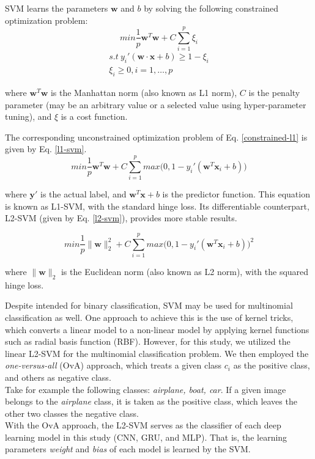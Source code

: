 \documentclass[sigconf]{acmart}
\renewcommand{\vec}[1]{\mathbf{#1}}
\begin{document}
SVM learns the parameters $\vec{w}$ and $b$ by solving the following constrained optimization problem:
\begin{equation} \label{constrained-l1}
min \dfrac{1}{p}\vec{w}^{T}\vec{w} + C \sum_{i = 1}^{p} \xi_i
\end{equation}
\begin{align}
s.t\ y_{i}'(\vec{w} \cdot \vec{x} + b) \geq 1 - \xi_i\\
\xi_i \geq 0, i = 1, \dots, p
\end{align}

where $\vec{w}^{T} \vec{w}$ is the Manhattan norm (also known as L1 norm), $C$ is the penalty parameter (may be an arbitrary value or a selected value using hyper-parameter tuning), and $\xi$ is a cost function.

The corresponding unconstrained optimization problem of Eq. \ref{constrained-l1} is given by Eq. \ref{l1-svm}.
\begin{equation} \label{l1-svm}
min \dfrac{1}{p}\vec{w}^{T}\vec{w} + C \sum_{i = 1}^{p} max\big(0, 1 - y_{i}'(\vec{w}^{T}\vec{x}_{i}+b)\big)
\end{equation}

\indent where $\vec{y'}$ is the actual label, and $\vec{w}^T\vec{x} + b$ is the predictor function. This equation is known as L1-SVM, with the standard hinge loss. Its differentiable counterpart, L2-SVM (given by Eq. \ref{l2-svm}), provides more stable results\cite{tang2013deep}.

\begin{equation}\label{l2-svm}
min \dfrac{1}{p}\|\vec{w}\|_{2}^{2} + C \sum_{i = 1}^{p} max\big(0, 1 - y_{i}'(\vec{w}^{T}\vec{x}_{i}+b)\big)^{2}
\end{equation}

where $\|\vec{w}\|_{2}$ is the Euclidean norm (also known as L2 norm), with the squared hinge loss.

Despite intended for binary classification, SVM may be used for multinomial classification as well. One approach to achieve this is the use of kernel tricks, which converts a linear model to a non-linear model by applying kernel functions such as radial basis function (RBF). However, for this study, we utilized the linear L2-SVM for the multinomial classification problem. We then employed the \textit{one-versus-all} (OvA) approach, which treats a given class $c_{i}$ as the positive class, and others as negative class.\\
\indent	Take for example the following classes: \textit{airplane, boat, car}. If a given image belongs to the \textit{airplane} class, it is taken as the positive class, which leaves the other two classes the negative class.\\
\indent	With the OvA approach, the L2-SVM serves as the classifier of each deep learning model in this study (CNN, GRU, and MLP). That is, the learning parameters \textit{weight} and \textit{bias} of each model is learned by the SVM.
\end{document}
